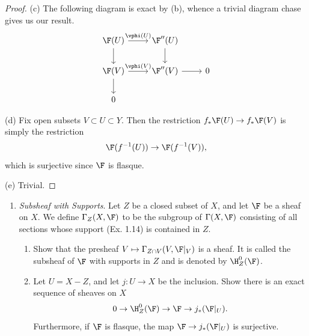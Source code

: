 \documentclass[12pt]{amsart}
\begin{document}
\begin{proof}
  (c) The following diagram is exact by (b), whence a trivial diagram chase gives us our result.
  \[
    \begin{tikzcd}
      \F(U)\ar[r,"\vphi(U)"]\ar[d] &\F''(U) \ar[d] \\
      \F(V)\ar[r, "\vphi(V)"]\ar[d] &\F''(V)\ar[r] &0 \\
              0
    \end{tikzcd}
  \] 

  (d) Fix open subsets $V\subset U\subset Y$.
  Then the restriction $f_*\F(U)\to f_*\F(V)$ is simply the restriction
  \[
    \F(f^{-1}(U))\to \F(f^{-1}(V)),
  \] 
  which is surjective since $\F$ is flasque.

  (e) Trivial.
\end{proof}

% 

\begin{enumerate}
  \item[1.20.] {
      \emph{Subsheaf with Supports}.
      Let $Z$ be a closed subset of $X$, and let $\F$ be a sheaf on $X$.
      We define $\Gamma_Z(X,\F)$ to be the subgroup of $\Gamma(X,\F)$ consisting of all sections whose support (Ex. 1.14) is contained in $Z$.
      \begin{enumerate}
        \item Show that the presheaf $V\mapsto \Gamma_{Z\cap V}(V,\F|_V)$ is a sheaf.
          It is called the subsheaf of $\F$ with supports in $Z$ and is denoted by $\H_Z^0(\F)$.
        \item Let $U=X-Z$, and let $j:U\to X$ be the inclusion.
          Show there is an exact sequence of sheaves on $X$
          \[
            0\to \H_Z^0(\F)\to \F\to j_*(\F|_U).
          \] 
          Furthermore, if $\F$ is flasque, the map $\F\to j_*(\F|_U)$ is surjective.
      \end{enumerate}
    }
\end{enumerate}
\end{document}
